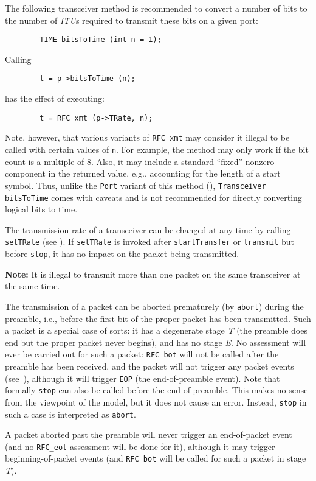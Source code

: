 The following transceiver method is recommended
to convert a number of bits to the number of {\em ITU\/}s
required to transmit these bits on a given port:
\begin{verbatim}
        TIME bitsToTime (int n = 1);
\end{verbatim}
Calling
\begin{verbatim}
        t = p->bitsToTime (n);
\end{verbatim}
has the effect of executing:
\begin{verbatim}
        t = RFC_xmt (p->TRate, n);
\end{verbatim}
\noindent
Note, however, that various variants of {\tt RFC\_xmt} may consider it illegal
to be called with certain values of {\tt n}.
For example, the method may only work if the bit count is a multiple of 8.
Also, it may include a standard ``fixed'' nonzero component in the returned
value, e.g., accounting for the length of a start symbol.
Thus, unlike the {\tt Port} variant of this method (),
{\tt Transceiver} {\tt bitsToTime} comes with caveats and is not recommended
for directly converting logical bits to time.

\medskip

The transmission rate of a transceiver can be changed at any time by calling
{\tt setTRate} (see ).
If {\tt setTRate} is invoked after {\tt startTransfer} or {\tt transmit} but
before {\tt stop}, it has no impact on the packet being transmitted.

\noindent
{\bf Note:}
It is illegal to transmit more than one packet on the same transceiver
at the same time.

The transmission of a packet can be aborted prematurely (by {\tt abort})
during the preamble, i.e., before the first bit of the proper packet has
been transmitted.
Such a packet is a special case of sorts: it has a degenerate stage
{\em T\/} (the preamble does end but
the proper packet never begins),
and has no stage {\em E}.
No assessment will ever be carried out
for such a packet: {\tt RFC\_bot} will not
be called after the preamble has been received, and the packet will not trigger
any packet events (see~), although it will trigger 
{\tt EOP} (the end-of-preamble event).
Note that formally {\tt stop} can also be called before the end of preamble.
This makes no sense from the viewpoint of the model, but it does not cause
an error.
Instead, {\tt stop} in such a case is interpreted as {\tt abort}.

A packet aborted past the preamble will never trigger 
an end-of-packet event (and no {\tt RFC\_eot} assessment will be done for
it), although it may trigger beginning-of-packet events (and {\tt RFC\_bot}
will be called for such a packet in stage {\em T\/}).

